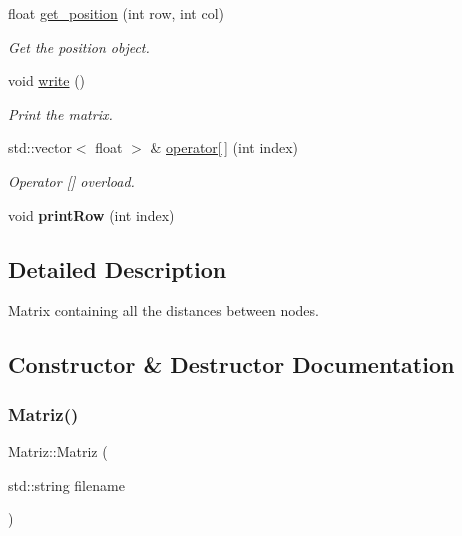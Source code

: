 \begin{DoxyCompactItemize}
float \hyperlink{classMatriz_aaf1b9c3af2d3b269cc0a2dda08aebd61}{get\+\_\+position} (int row, int col)
\begin{DoxyCompactList}\small\item\em Get the position object. \end{DoxyCompactList}\item 
\mbox{\label{classMatriz_ae0fd5f42c3797c8d4b85c1d6701e0e7e}} 
void \hyperlink{classMatriz_ae0fd5f42c3797c8d4b85c1d6701e0e7e}{write} ()
\begin{DoxyCompactList}\small\item\em Print the matrix. \end{DoxyCompactList}\item 
std\+::vector$<$ float $>$ \& \hyperlink{classMatriz_a5516a9b9524e4604d4b3040628be50e9}{operator\mbox{[}$\,$\mbox{]}} (int index)
\begin{DoxyCompactList}\small\item\em Operator \mbox{[}\mbox{]} overload. \end{DoxyCompactList}\item 
\mbox{\label{classMatriz_afa298e352ed08188e16edf49fc49fcc2}} 
void {\bfseries print\+Row} (int index)
\end{DoxyCompactItemize}


\subsection{Detailed Description}
Matrix containing all the distances between nodes. 

\subsection{Constructor \& Destructor Documentation}
\mbox{\label{classMatriz_a388709cfee356a0c78b66e3f538e9318}} 
\subsubsection{\texorpdfstring{Matriz()}{Matriz()}}
{\footnotesize\ttfamily Matriz\+::\+Matriz (\begin{DoxyParamCaption}\item[{std\+::string}]{filename }\end{DoxyParamCaption})\hspace{0.3cm}{\ttfamily [inline]}}



